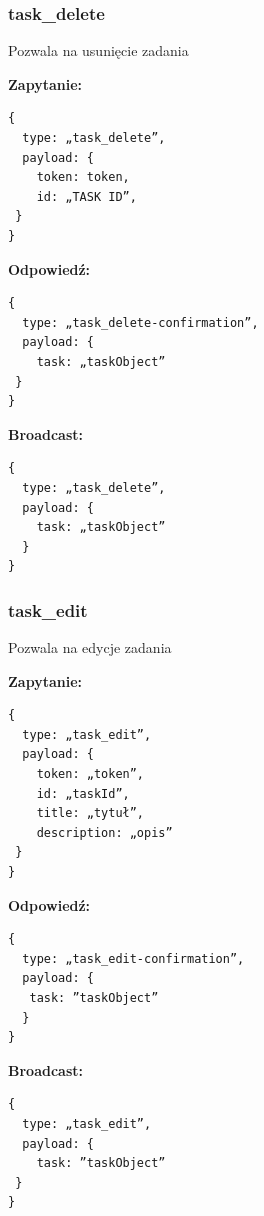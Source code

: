 \documentclass[12pt,a4paper]{article}  %
\begin{document}
\subsubsection{task\_delete}
Pozwala na usunięcie zadania \\
\begin{flushleft}
\textbf{Zapytanie:}
\begin{verbatim}
{
  type: „task_delete”,
  payload: {
    token: token,
    id: „TASK ID”,
 }
}
\end{verbatim}
\textbf{Odpowiedź:}
\begin{verbatim}
{
  type: „task_delete-confirmation”,
  payload: {
    task: „taskObject”
 }
}
\end{verbatim}
\textbf{Broadcast:}
\begin{verbatim}
{
  type: „task_delete”,
  payload: {
    task: „taskObject”
  }
}
\end{verbatim}
\end{flushleft}
\newpage
\subsubsection{task\_edit}
Pozwala na edycje zadania \\
\begin{flushleft}
\textbf{Zapytanie:}
\begin{verbatim}
{
  type: „task_edit”,
  payload: {      
    token: „token”,
    id: „taskId”,
    title: „tytuł”,
    description: „opis”
 }
}
\end{verbatim}
\textbf{Odpowiedź:}
\begin{verbatim}
{
  type: „task_edit-confirmation”,
  payload: {
   task: ”taskObject”
  }
}
\end{verbatim}
\textbf{Broadcast:}
\begin{verbatim}
{
  type: „task_edit”,
  payload: {
    task: ”taskObject”
 }
}
\end{verbatim}
\end{flushleft}
\end{document}
